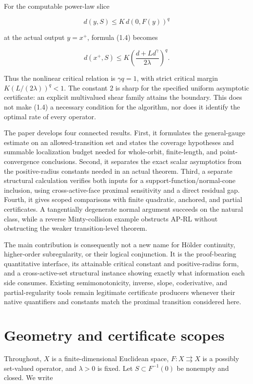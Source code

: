 \documentclass[11pt,a4paper]{article}
\theoremstyle{plain}
\theoremstyle{definition}
\theoremstyle{remark}
\begin{document}
For the computable power-law slice

\[
d(y,S)\le K\,d(0,F(y))^q
\tag{1.5}
\]

at the actual output \(y=x^+\), formula (1.4) becomes

\[
d(x^+,S)\le
K\left(\frac{d+Ld^\gamma}{2\lambda}\right)^q.
\tag{1.6}
\]

Thus the nonlinear critical relation is \(\gamma q=1\), with strict
critical margin \(K(L/(2\lambda))^q<1\). The constant \(2\) is sharp for
the specified uniform asymptotic certificate: an explicit multivalued
shear family attains the boundary. This does not make (1.4) a necessary
condition for the algorithm, nor does it identify the optimal rate of
every operator.

The paper develops four connected results. First, it formulates the
general-gauge estimate on an allowed-transition set and states the
coverage hypotheses and summable localization budget needed for
whole-orbit, finite-length, and point-convergence conclusions. Second,
it separates the exact scalar asymptotics from the positive-radius
constants needed in an actual theorem. Third, a separate structural
calculation verifies both inputs for a support-function/normal-cone
inclusion, using cross-active-face proximal sensitivity and a direct
residual gap. Fourth, it gives scoped comparisons with finite quadratic,
anchored, and partial certificates. A tangentially degenerate normal
argument succeeds on the natural class, while a reverse Minty-collision
example obstructs AP-RL without obstructing the weaker transition-level
theorem.

The main contribution is consequently not a new name for Hölder
continuity, higher-order subregularity, or their logical conjunction. It
is the proof-bearing quantitative interface, its attainable critical
constant and positive-radius form, and a cross-active-set structural
instance showing exactly what information each side consumes. Existing
semimonotonicity, inverse, slope, coderivative, and partial-regularity
tools remain legitimate certificate producers whenever their native
quantifiers and constants match the proximal transition considered here.

\hypertarget{geometry-and-certificate-scopes}{%
\section{Geometry and certificate
scopes}\label{geometry-and-certificate-scopes}}

Throughout, \(X\) is a finite-dimensional Euclidean space,
\(F:X\rightrightarrows X\) is a possibly set-valued operator, and
\(\lambda>0\) is fixed. Let \(S\subset F^{-1}(0)\) be nonempty and
closed. We write
\end{document}

